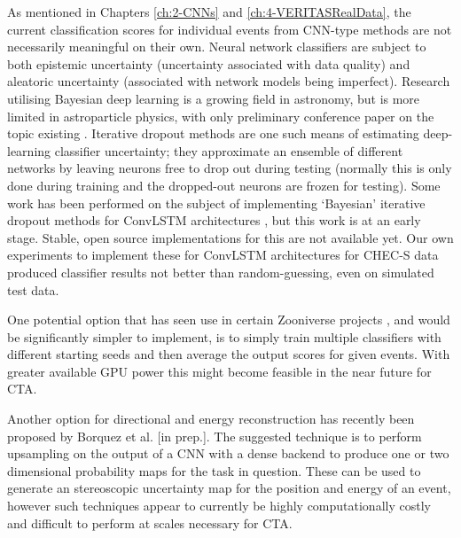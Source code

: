 As mentioned in Chapters \ref{ch:2-CNNs} and \ref{ch:4-VERITASRealData}, the current classification scores for individual events from CNN-type methods are not necessarily meaningful on their own. Neural network classifiers are subject to both epistemic uncertainty (uncertainty associated with data quality) and aleatoric uncertainty (associated with network models being imperfect). Research utilising Bayesian deep learning is a growing field in astronomy, but is more limited in astroparticle physics, with only preliminary conference paper on the topic existing \cite{bayesianwcd}. Iterative dropout methods are one such means of estimating deep-learning classifier uncertainty; they approximate an ensemble of different networks by leaving neurons free to drop out during testing (normally this is only done during training and the dropped-out neurons are frozen for testing). Some work has been performed on the subject of implementing `Bayesian' iterative dropout methods for ConvLSTM architectures \cite{bayesconv}, but this work is at an early stage. Stable, open source implementations for this are not available yet. Our own experiments to implement these for ConvLSTM architectures for CHEC-S data produced classifier results not better than random-guessing, even on simulated test data.

One potential option that has seen use in certain Zooniverse projects \cite{mike}, and would be significantly simpler to implement, is to simply train multiple classifiers with different starting seeds and then average the output scores for given events. With greater available GPU power this might become feasible in the near future for CTA.

Another option for directional and energy reconstruction has recently been proposed by Borquez et al. [in prep.]. The suggested technique is to perform upsampling on the output of a CNN with a dense backend to produce one or two dimensional probability maps for the task in question. These can be used to generate an stereoscopic uncertainty map for the position and energy of an event, however such techniques appear to currently be highly computationally costly and difficult to perform at scales necessary for CTA.


